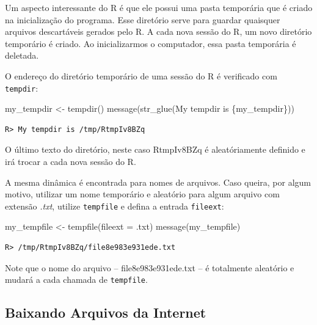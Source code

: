 \documentclass[
  11pt,
]{book}
\newenvironment{Shaded}{\begin{snugshade}}{\end{snugshade}}
\newcommand{\AttributeTok}[1]{\textcolor[rgb]{0.61,0.61,0.61}{#1}}
\newcommand{\FunctionTok}[1]{\textcolor[rgb]{0,0,0}{#1}}
\newcommand{\NormalTok}[1]{#1}
\newcommand{\OtherTok}[1]{\textcolor[rgb]{0.37,0.37,0.37}{#1}}
\newcommand{\StringTok}[1]{\textcolor[rgb]{0.5,0.5,0.5}{#1}}
\begin{document}
Um aspecto interessante do R é que ele possui uma pasta temporária que é criado na inicialização do programa. Esse diretório serve para guardar quaisquer arquivos descartáveis gerados pelo R. A cada nova sessão do R, um novo diretório temporário é criado. Ao inicializarmos o computador, essa pasta temporária é deletada.

O endereço do diretório temporário de uma sessão do R é verificado com \texttt{tempdir}:

\begin{Shaded}
\begin{Highlighting}[]
\NormalTok{my\_tempdir }\OtherTok{\textless{}{-}} \FunctionTok{tempdir}\NormalTok{()}
\FunctionTok{message}\NormalTok{(}\FunctionTok{str\_glue}\NormalTok{(}\StringTok{\textquotesingle{}My tempdir is \{my\_tempdir\}\textquotesingle{}}\NormalTok{))}
\end{Highlighting}
\end{Shaded}

\begin{verbatim}
R> My tempdir is /tmp/RtmpIv8BZq
\end{verbatim}

O último texto do diretório, neste caso RtmpIv8BZq é aleatóriamente definido e irá trocar a cada nova sessão do R.

A mesma dinâmica é encontrada para nomes de arquivos. Caso queira, por algum motivo, utilizar um nome temporário e aleatório para algum arquivo com extensão \emph{.txt}, utilize \texttt{tempfile} e defina a entrada \texttt{fileext}:

\begin{Shaded}
\begin{Highlighting}[]
\NormalTok{my\_tempfile }\OtherTok{\textless{}{-}} \FunctionTok{tempfile}\NormalTok{(}\AttributeTok{fileext =} \StringTok{\textquotesingle{}.txt\textquotesingle{}}\NormalTok{)}
\FunctionTok{message}\NormalTok{(my\_tempfile)}
\end{Highlighting}
\end{Shaded}

\begin{verbatim}
R> /tmp/RtmpIv8BZq/file8e983e931ede.txt
\end{verbatim}

Note que o nome do arquivo -- file8e983e931ede.txt -- é totalmente aleatório e mudará a cada chamada de \texttt{tempfile}.

\hypertarget{baixando-arquivos-da-internet}{%
\subsection{Baixando Arquivos da Internet}\label{baixando-arquivos-da-internet}}
\end{document}
